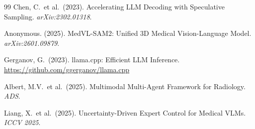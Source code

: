 \documentclass[10pt,twocolumn]{article}
\begin{document}
\begin{thebibliography}{99}
Chen, C.\ et al.\ (2023).
Accelerating LLM Decoding with Speculative Sampling.
\emph{arXiv:2302.01318}.

Anonymous. (2025).
MedVL-SAM2: Unified 3D Medical Vision-Language Model.
\emph{arXiv:2601.09879}.

Gerganov, G.\ (2023).
llama.cpp: Efficient LLM Inference.
\url{https://github.com/ggerganov/llama.cpp}

Albert, M.V.\ et al.\ (2025).
Multimodal Multi-Agent Framework for Radiology.
\emph{ADS}.

Liang, X.\ et al.\ (2025).
Uncertainty-Driven Expert Control for Medical VLMs.
\emph{ICCV 2025}.

\end{thebibliography}
\end{document}

